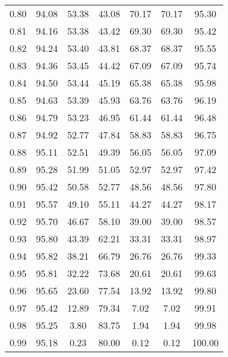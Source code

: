 \begin{tabular}{|c|c|c|c|c|c|c|}
      0.80 &     94.08 &     53.38 &      43.08 &   70.17 &      70.17 &         95.30 \\
      0.81 &     94.16 &     53.38 &      43.42 &   69.30 &      69.30 &         95.42 \\
      0.82 &     94.24 &     53.40 &      43.81 &   68.37 &      68.37 &         95.55 \\
      0.83 &     94.36 &     53.45 &      44.42 &   67.09 &      67.09 &         95.74 \\
      0.84 &     94.50 &     53.44 &      45.19 &   65.38 &      65.38 &         95.98 \\
      0.85 &     94.63 &     53.39 &      45.93 &   63.76 &      63.76 &         96.19 \\
      0.86 &     94.79 &     53.23 &      46.95 &   61.44 &      61.44 &         96.48 \\
      0.87 &     94.92 &     52.77 &      47.84 &   58.83 &      58.83 &         96.75 \\
      0.88 &     95.11 &     52.51 &      49.39 &   56.05 &      56.05 &         97.09 \\
      0.89 &     95.28 &     51.99 &      51.05 &   52.97 &      52.97 &         97.42 \\
      0.90 &     95.42 &     50.58 &      52.77 &   48.56 &      48.56 &         97.80 \\
      0.91 &     95.57 &     49.10 &      55.11 &   44.27 &      44.27 &         98.17 \\
      0.92 &     95.70 &     46.67 &      58.10 &   39.00 &      39.00 &         98.57 \\
      0.93 &     95.80 &     43.39 &      62.21 &   33.31 &      33.31 &         98.97 \\
      0.94 &     95.82 &     38.21 &      66.79 &   26.76 &      26.76 &         99.33 \\
      0.95 &     95.81 &     32.22 &      73.68 &   20.61 &      20.61 &         99.63 \\
      0.96 &     95.65 &     23.60 &      77.54 &   13.92 &      13.92 &         99.80 \\
      0.97 &     95.42 &     12.89 &      79.34 &    7.02 &       7.02 &         99.91 \\
      0.98 &     95.25 &      3.80 &      83.75 &    1.94 &       1.94 &         99.98 \\
      0.99 &     95.18 &      0.23 &      80.00 &    0.12 &       0.12 &        100.00 \\
\bottomrule
\end{tabular}
